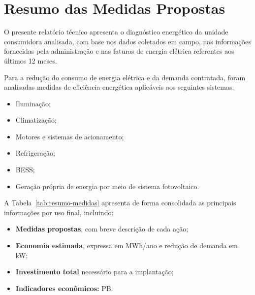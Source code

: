 \chapter{Resumo das Medidas Propostas}


O presente relatório técnico apresenta o diagnóstico energético da unidade consumidora analisada, com base nos dados coletados em campo, nas informações fornecidas pela administração e nas faturas de energia elétrica referentes aos últimos 12 meses.

Para a redução do consumo de energia elétrica e da demanda contratada, foram analisadas medidas de eficiência energética aplicáveis aos seguintes sistemas:


\begin{itemize}
    \item Iluminação;
    \item Climatização;
    \item Motores e sistemas de acionamento;
    \item Refrigeração;
    \item \ac{BESS};
    \item Geração própria de energia por meio de sistema fotovoltaico.
\end{itemize}

A Tabela~\ref{tab:resumo-medidas} apresenta de forma consolidada as principais informações por uso final, incluindo:

\begin{itemize}
    \item \textbf{Medidas propostas}, com breve descrição de cada ação;
    \item \textbf{Economia estimada}, expressa em MWh/ano e redução de demanda em kW;
    \item \textbf{Investimento total} necessário para a implantação;
    \item \textbf{Indicadores econômicos:} \ac{PB}.
\end{itemize}

\clearpage


